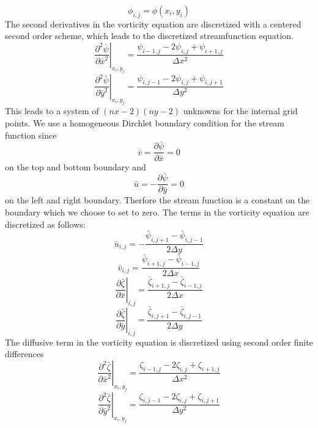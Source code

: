 \begin{equation}
\phi_{i,j} = \phi(x_i,y_i)
\end{equation} 
The second derivatives in the vorticity equation are discretized with a centered second order scheme, which leads to the discretized streamfunction equation.
\begin{equation}
\left. \frac{\partial^2 \bar{\psi}}{\partial \bar{x}^2}\right|_{x_i,y_j} = \frac{\psi_{i-1,j} - 2 \psi_{i,j} + \psi_{i+1,j}}{\Delta x^2}
\end{equation}
\begin{equation}
\left. \frac{\partial^2 \bar{\psi}}{\partial \bar{y}^2}\right|_{x_i,y_j} = \frac{\psi_{i,j-1} - 2 \psi_{i,j} + \psi_{i,j+1}}{\Delta y^2}
\end{equation}
This leads to a system of $(nx-2)(ny-2)$ unknowns for the internal grid points. We use a homogeneous Dirchlet boundary condition for the stream function since
\begin{equation}
\bar{v} = \frac{\partial \bar{\psi}}{\partial \bar{x}} = 0
\end{equation}
on the top and bottom boundary and
\begin{equation}
\bar{u} = -\frac{\partial \bar{\psi}}{\partial \bar{y}} = 0
\end{equation}
on the left and right boundary. Therfore the stream function is a constant on the boundary which we choose to set to zero.
The terms in the vorticity equation are discretized as follows:
\begin{equation}
\bar{u}_{i,j} = - \frac{\bar{\psi}_{i,j+1} - \bar{\psi}_{i,j-1}}{2 \Delta y}
\end{equation}
\begin{equation}
\bar{v}_{i,j} = \frac{\bar{\psi}_{i+1,j} - \bar{\psi}_{i-1,j}}{2 \Delta x}
\end{equation}
\begin{equation}
\left. \frac{\partial \bar{\zeta}}{\partial \bar{x}} \right|_{i,j} = \frac{\bar{\zeta}_{i+1,j}- \bar{\zeta}_{i-1,j}}{2 \Delta x}
\end{equation}
\begin{equation}
\left. \frac{\partial \bar{\zeta}}{\partial \bar{y}} \right|_{i,j} = \frac{\bar{\zeta}_{i,j+1}- \bar{\zeta}_{i,j-1}}{2 \Delta y}
\end{equation}
The diffusive term in the vorticity equation is discretized using second order finite differences\begin{equation}
\left. \frac{\partial^2 \bar{\zeta}}{\partial \bar{x}^2}\right|_{x_i,y_j} = \frac{\zeta_{i-1,j} - 2 \zeta_{i,j} + \zeta_{i+1,j}}{\Delta x^2}
\end{equation}
\begin{equation}
\left. \frac{\partial^2 \bar{\zeta}}{\partial \bar{y}^2}\right|_{x_i,y_j} = \frac{\zeta_{i,j-1} - 2 \zeta_{i,j} + \zeta_{i,j+1}}{\Delta y^2}
\end{equation}